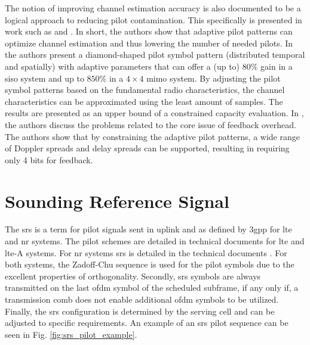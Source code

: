 The notion of improving channel estimation accuracy is also documented to be a logical approach to reducing pilot contamination. This specifically is presented in work such as \cite{Simko2013AdaptiveSystems} and \cite{Simko2013DesignPatterns}. In short, the authors show that adaptive pilot patterns can optimize channel estimation and thus lowering the number of needed pilots. In \cite{Simko2013AdaptiveSystems} the authors present a diamond-shaped pilot symbol pattern (distributed temporal and spatially) with adaptive parameters that can offer a (up to) $80\%$ gain in a \gls{siso} system and up to $850\%$ in a $4 \times 4$ \gls{mimo} system. By adjusting the pilot symbol patterns based on the fundamental radio characteristics, the channel characteristics can be approximated using the least amount of samples. The results are presented as an upper bound of a constrained capacity evaluation. In \cite{Simko2013DesignPatterns}, the authors discuss the problems related to the core issue of feedback overhead. The authors show that by constraining the adaptive pilot patterns, a wide range of Doppler spreads and delay spreads can be supported, resulting in requiring only 4 bits for feedback. 





\section{Sounding Reference Signal}\label{sec:srs_sequence_definition}

The \gls{srs} is a term for pilot signals sent in uplink and as defined by \gls{3gpp} for \gls{lte} and \gls{nr} systems. The pilot schemes are detailed in technical documents \cite{36211, 3GPP2020TS15} for \gls{lte} and \gls{lte}-A systems. For \gls{nr} systems \gls{srs} is detailed in the technical documents \cite{38211, 3GPP2020TS15b}. For both systems, the Zadoff-Chu sequence is used for the pilot symbols due to the excellent properties of orthogonality. Secondly, \gls{srs} symbols are always transmitted on the last \gls{ofdm} symbol of the scheduled subframe, if any only if, a transmission comb does not enable additional \gls{ofdm} symbols to be utilized. Finally, the \gls{srs} configuration is determined by the serving cell and can be adjusted to specific requirements. An example of an \gls{srs} pilot sequence can be seen in Fig. \ref{fig:srs_pilot_example}.

